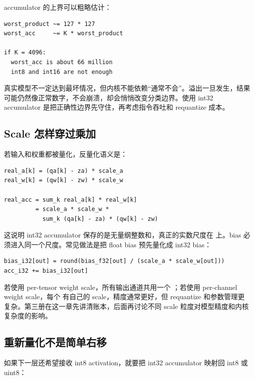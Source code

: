 accumulator 的上界可以粗略估计：

\begin{lstlisting}[numbers=none,caption={accumulator 范围估计}]
worst_product ~= 127 * 127
worst_acc     ~= K * worst_product

if K = 4096:
  worst_acc is about 66 million
  int8 and int16 are not enough
\end{lstlisting}

真实模型不一定达到最坏情况，但内核不能依赖“通常不会”。溢出一旦发生，结果可能仍然像正常数字，不会崩溃，却会悄悄改变分类边界。使用 int32 accumulator 是把正确性边界先守住，再考虑指令吞吐和 requantize 成本。

\subsection{Scale 怎样穿过乘加}

若输入和权重都被量化，反量化语义是：

\begin{lstlisting}[numbers=none,caption={从量化值恢复 dot-product 语义}]
real_a[k] = (qa[k] - za) * scale_a
real_w[k] = (qw[k] - zw) * scale_w

real_acc = sum_k real_a[k] * real_w[k]
         = scale_a * scale_w *
           sum_k (qa[k] - za) * (qw[k] - zw)
\end{lstlisting}

这说明 int32 accumulator 保存的是无量纲整数和，真正的实数尺度在  上。bias 必须进入同一个尺度。常见做法是把 float bias 预先量化成 int32 bias：

\begin{lstlisting}[numbers=none,caption={bias 折叠到 int32 accumulator}]
bias_i32[out] = round(bias_f32[out] / (scale_a * scale_w[out]))
acc_i32 += bias_i32[out]
\end{lstlisting}

若使用 per-tensor weight scale，所有输出通道共用一个 ；若使用 per-channel weight scale，每个  有自己的 scale，精度通常更好，但 requantize 和参数管理更复杂。第三册在这一章先讲清账本，后面再讨论不同 scale 粒度对模型精度和内核复杂度的影响。

\subsection{重新量化不是简单右移}

如果下一层还希望接收 int8 activation，就要把 int32 accumulator 映射回 int8 或 uint8：

